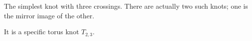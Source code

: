 The simplest knot with three crossings. There are
actually two such knots; one is the mirror image of the other.
\par
It is a specific torus knot $T_{2,3}.$ 